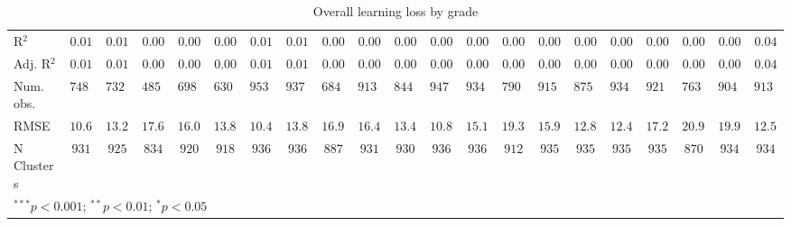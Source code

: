 \begin{table}
\begin{center}
\begin{tabular}{l c c c c c c c c c c c c c c c c c c c c}
\hline
R$^2$       & $0.01$        & $0.01$        & $0.00$        & $0.00$        & $0.00$       & $0.01$        & $0.01$        & $0.00$        & $0.00$        & $0.00$       & $0.00$        & $0.00$        & $0.00$        & $0.00$        & $0.00$       & $0.00$        & $0.00$        & $0.00$        & $0.00$        & $0.04$        \\
Adj. R$^2$  & $0.01$        & $0.01$        & $0.00$        & $0.00$        & $0.00$       & $0.01$        & $0.01$        & $0.00$        & $0.00$        & $0.00$       & $0.00$        & $0.00$        & $0.00$        & $0.00$        & $0.00$       & $0.00$        & $0.00$        & $0.00$        & $0.00$        & $0.04$        \\
Num. obs.   & $74829$       & $73263$       & $48537$       & $69841$       & $63094$      & $95364$       & $93769$       & $68412$       & $91315$       & $84443$      & $94747$       & $93417$       & $79016$       & $91567$       & $87584$      & $93439$       & $92180$       & $76397$       & $90403$       & $91356$       \\
RMSE        & $10.67$       & $13.27$       & $17.64$       & $16.09$       & $13.80$      & $10.42$       & $13.80$       & $16.90$       & $16.40$       & $13.49$      & $10.85$       & $15.18$       & $19.38$       & $15.91$       & $12.80$      & $12.47$       & $17.24$       & $20.92$       & $19.91$       & $12.55$       \\
N Clusters  & $931$         & $925$         & $834$         & $920$         & $918$        & $936$         & $936$         & $887$         & $931$         & $930$        & $936$         & $936$         & $912$         & $935$         & $935$        & $935$         & $935$         & $870$         & $934$         & $934$         \\
\hline
\multicolumn{21}{l}{\scriptsize{$^{***}p<0.001$; $^{**}p<0.01$; $^{*}p<0.05$}}
\end{tabular}
\caption{Overall learning loss by grade}
\label{table:grade}
\end{center}
\end{table}
